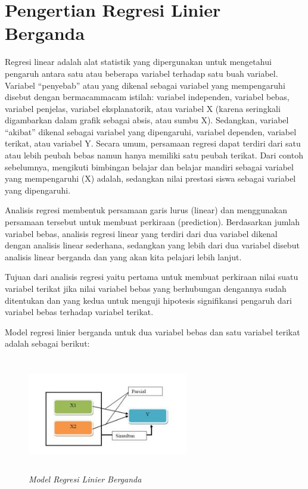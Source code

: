 \section{Pengertian Regresi Linier Berganda}
\par Regresi linear adalah alat statistik yang dipergunakan untuk mengetahui pengaruh antara satu atau beberapa variabel terhadap satu buah variabel. Variabel “penyebab” atau yang dikenal sebagai variabel yang mempengaruhi disebut dengan bermacammacam istilah: variabel independen, variabel bebas, variabel penjelas, variabel eksplanatorik, atau variabel X (karena seringkali digambarkan dalam grafik sebagai absis, atau sumbu X). Sedangkan, variabel “akibat” dikenal sebagai variabel yang dipengaruhi, variabel dependen, variabel terikat, atau variabel Y. Secara umum, persamaan regresi dapat terdiri dari satu atau lebih peubah bebas namun hanya memiliki satu peubah terikat. Dari contoh sebelumnya, mengikuti bimbingan belajar dan belajar mandiri sebagai variabel yang mempengaruhi (X) adalah, sedangkan nilai prestasi siswa sebagai variabel yang dipengaruhi.  
\par Analisis regresi membentuk persamaan garis lurus (linear) dan menggunakan persamaan tersebut untuk membuat perkiraan (prediction). Berdasarkan jumlah variabel bebas, analisis regresi linear yang terdiri dari dua variabel dikenal dengan analisis linear sederhana, sedangkan yang lebih dari dua variabel disebut analisis linear berganda dan yang akan kita pelajari lebih lanjut.  
\par Tujuan dari analisis regresi yaitu pertama untuk membuat perkiraan nilai suatu variabel terikat jika nilai variabel bebas yang berhubungan dengannya sudah ditentukan dan yang kedua untuk menguji hipotesis signifikansi pengaruh dari variabel bebas terhadap variabel terikat.  
\par Model regresi linier berganda untuk dua variabel bebas dan satu variabel terikat adalah sebagai berikut: 
\begin{figure}[hb]
\centering
\includegraphics[width=7cm, height=5cm]{figures/modelregresi.JPG}
\caption{\textit{Model Regresi Linier Berganda}
\label{eq:31}}
\end{figure} 
